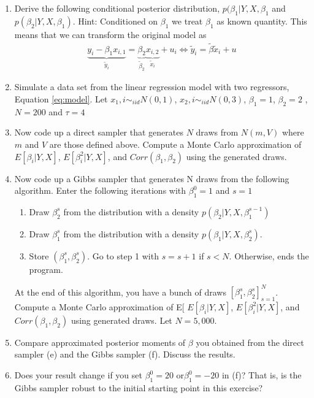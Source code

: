 \documentclass[12pt,onecolumn]{article}
\begin{document}
\begin{enumerate}
\begin{enumerate}
  \item Derive the following conditional posterior distribution, $p(\beta_1|Y,X,\beta_1$ and $p(\beta_2|Y,X,\beta_1)$. Hint: Conditioned on $\beta_1$ we treat $\beta_1$ as known quantity. This means that we can transform the original model as
  \begin{align}
    \underset{\tilde{y}_{i}}{\underbrace{y_{i}-\beta_{1}x_{i,1}}}=\underset{\tilde{\beta}_{2}}{\underbrace{\beta_{2}}}\underset{\tilde{x}_{i}}{\underbrace{x_{i,2}}}+u_{i}\iff\tilde{y}_{i}=\tilde{\beta}\tilde{x}_{i}+u
  \end{align}
  \item Simulate a data set from the linear regression model with two regressors, Equation \eqref{eq:model}. Let $x_1,i\sim_{iid}N(0,1)$, $x_2,i\sim_{iid}N(0,3)$, $\beta_1=1$, $\beta_2=2$ , $N =200$ and $\tau= 4$
  \item Now code up a direct sampler that generates $N$ draws from $N(m,V)$ where $m$ and $V$ are those defined above. Compute a Monte Carlo approximation of $E[\beta_i|Y, X]$, $E[\beta^2_i|Y, X]$, and $Corr(\beta_1, \beta_2)$ using the generated draws.
  \item Now code up a Gibbs sampler that generates N draws from the following algorithm. Enter the following iterations with $\beta^{0}_1=1$ and $s=1$
  \begin{enumerate}
    \item Draw $\beta^s_2$ from the distribution with a density $p(\beta_2|Y, X, \beta^{s-1}_1)$
  \item Draw $\beta^s_1$ from the distribution with a density $p(\beta_1|Y, X, \beta^s_2)$.
  \item Store $(\beta^s_1,\beta^s_2)$. Go to step 1 with $s = s+1$ if $s < N$. Otherwise, ends the program.  
  \end{enumerate}
  At the end of this algorithm, you have a bunch of draws $[\beta^s_1,\beta^s_2]^N_{s=1}$. Compute a Monte Carlo approximation of E[ $E[\beta_i|Y, X]$, $E[\beta^2_i|Y, X]$, and $Corr(\beta_1, \beta_2)$  using generated draws. Let $N = 5,000$.
\item  Compare approximated posterior moments of $\beta$ you obtained from the direct sampler (e) and the Gibbs sampler (f). Discuss the results.
\item  Does your result change if you set $\beta^0_1= 20$ or$\beta^0_1= -20$ in (f)? That is, is the Gibbs sampler robust to the initial starting point in this exercise?
\end{enumerate}


\end{enumerate}
\end{document}
